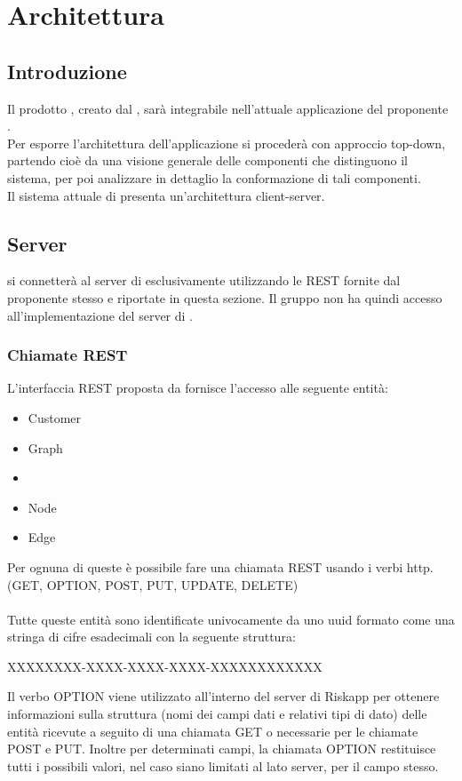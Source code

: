 \newpage

\section{Architettura \progetto}
	\subsection{Introduzione}
	Il prodotto \progetto{}, creato dal  \zephyrus{}, sarà integrabile nell'attuale applicazione del proponente \riskapp{}.\\
	Per esporre l'architettura dell'applicazione si procederà con approccio top-down, partendo cioè da una visione generale delle componenti che distinguono il sistema, per poi analizzare in dettaglio la conformazione di tali componenti.\\
	Il sistema attuale di \riskapp{} presenta un'architettura client-server.
	\subsection{Server}
	\progetto{} si connetterà al server di \riskapp{} esclusivamente utilizzando le  REST fornite dal proponente stesso e riportate in questa sezione. Il gruppo non ha quindi accesso all'implementazione del server di \riskapp{}.
	\subsubsection{Chiamate REST}
	L'interfaccia REST proposta da \riskapp{} fornisce l'accesso alle seguente entità:
	\begin{itemize}
		\item Customer
		\item Graph
		\item {}
		\item Node
		\item Edge
	\end{itemize}
	Per ognuna di queste è possibile fare una chiamata REST usando i verbi http. (GET, OPTION, POST, PUT, UPDATE, DELETE)\\\\
	Tutte queste entità sono identificate univocamente da uno uuid formato come una stringa di cifre esadecimali con la seguente struttura:
	\begin{center}
		XXXXXXXX-XXXX-XXXX-XXXX-XXXXXXXXXXXX
	\end{center}
	Il verbo OPTION viene utilizzato all'interno del server di Riskapp per ottenere informazioni sulla struttura (nomi dei campi dati e relativi tipi di dato) delle entità ricevute a seguito di una chiamata GET o necessarie per le chiamate POST e PUT.
	Inoltre per determinati campi, la chiamata OPTION restituisce tutti i possibili valori, nel caso siano limitati al lato server, per il campo stesso.
	

